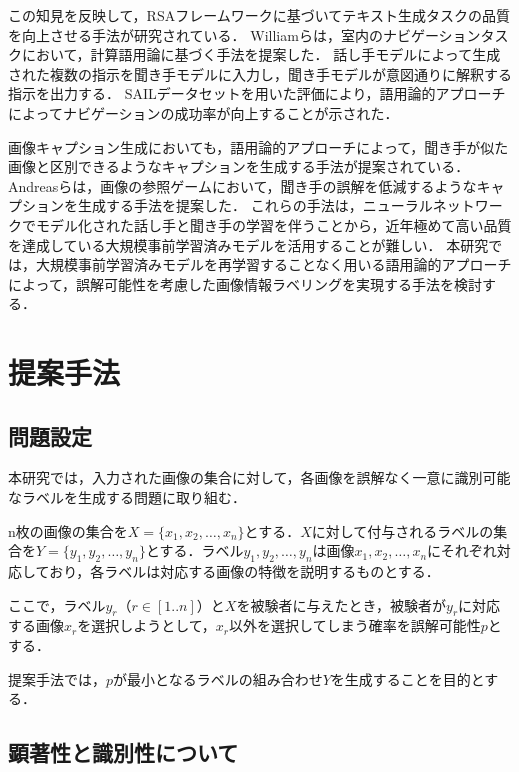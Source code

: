 \documentclass[a4paper,11pt]{jreport}
\begin{document}
この知見を反映して，RSAフレームワークに基づいてテキスト生成タスクの品質を向上させる手法が研究されている\cite{Fried2017}．
Williamら\cite{Williams2015}は，室内のナビゲーションタスクにおいて，計算語用論に基づく手法を提案した．
話し手モデルによって生成された複数の指示を聞き手モデルに入力し，聞き手モデルが意図通りに解釈する指示を出力する．
SAILデータセットを用いた評価により，語用論的アプローチによってナビゲーションの成功率が向上することが示された．

画像キャプション生成においても，語用論的アプローチによって，聞き手が似た画像と区別できるようなキャプションを生成する手法が提案されている\cite{Vedantam2017,Cohn-Gordon2018,Nie2020}．
Andreasら\cite{Andreas2016}は，画像の参照ゲームにおいて，聞き手の誤解を低減するようなキャプションを生成する手法を提案した．
これらの手法は，ニューラルネットワークでモデル化された話し手と聞き手の学習を伴うことから，近年極めて高い品質を達成している大規模事前学習済みモデルを活用することが難しい．
本研究では，大規模事前学習済みモデルを再学習することなく用いる語用論的アプローチによって，誤解可能性を考慮した画像情報ラベリングを実現する手法を検討する．

\chapter{提案手法}

\section{問題設定}

本研究では，入力された画像の集合に対して，各画像を誤解なく一意に識別可能なラベルを生成する問題に取り組む．

n枚の画像の集合を\(X = \{x_1, x_2, \ldots, x_n\}\)とする．\(X\)に対して付与されるラベルの集合を\(Y = \{y_1, y_2, \ldots, y_n\}\)とする．ラベル\(y_1, y_2, \ldots, y_n\)は画像\(x_1, x_2, \ldots, x_n\)にそれぞれ対応しており，各ラベルは対応する画像の特徴を説明するものとする．

ここで，ラベル\(y_r\)（$r \in [1..n]$）と\(X\)を被験者に与えたとき，被験者が\(y_r\)に対応する画像\(x_r\)を選択しようとして，\(x_r\)以外を選択してしまう確率を誤解可能性\(p\)とする．

提案手法では，\(p\)が最小となるラベルの組み合わせ\(Y\)を生成することを目的とする．

\section{顕著性と識別性について}
\end{document}
